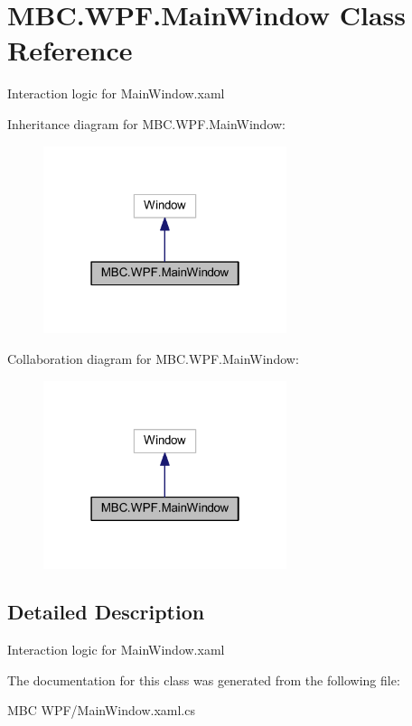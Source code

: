 \hypertarget{class_m_b_c_1_1_w_p_f_1_1_main_window}{\section{M\-B\-C.\-W\-P\-F.\-Main\-Window Class Reference}
\label{class_m_b_c_1_1_w_p_f_1_1_main_window}
}


Interaction logic for Main\-Window.\-xaml  




Inheritance diagram for M\-B\-C.\-W\-P\-F.\-Main\-Window\-:
\nopagebreak
\begin{figure}[H]
\begin{center}
\leavevmode
\includegraphics[width=202pt]{class_m_b_c_1_1_w_p_f_1_1_main_window__inherit__graph}
\end{center}
\end{figure}


Collaboration diagram for M\-B\-C.\-W\-P\-F.\-Main\-Window\-:
\nopagebreak
\begin{figure}[H]
\begin{center}
\leavevmode
\includegraphics[width=202pt]{class_m_b_c_1_1_w_p_f_1_1_main_window__coll__graph}
\end{center}
\end{figure}


\subsection{Detailed Description}
Interaction logic for Main\-Window.\-xaml 



The documentation for this class was generated from the following file\-:\begin{DoxyCompactItemize}
\item 
M\-B\-C W\-P\-F/Main\-Window.\-xaml.\-cs\end{DoxyCompactItemize}
